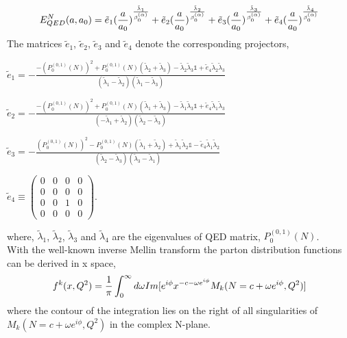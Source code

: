 \documentclass[review]{elsarticle}
\begin{document}
\begin{equation}
E_{QED}^{N}(a,a_{0})=\tilde{e}_{1}(\frac{a}{a_{0}})^{\frac{\tilde{\lambda}_{1}}{\text{\ensuremath{\beta_{0}^{(\alpha)}}}}}+\tilde{e}_{2}(\frac{a}{a_{0}})^{\frac{\tilde{\lambda}_{2}}{\text{\ensuremath{\beta_{0}^{(\alpha)}}}}}+\tilde{e}_{3}(\frac{a}{a_{0}})^{\frac{\tilde{\lambda}_{3}}{\beta_{0}^{(\alpha)}}}+\tilde{e}_{4}(\frac{a}{a_{0}})^{\frac{\tilde{\lambda}_{4}}{\text{\ensuremath{\beta_{0}^{(\alpha)}}}}}\label{eq:26}
\end{equation}
The matrices $\tilde{e}_{1}$, $\tilde{e}_{2}$, $\tilde{e}_{3}$
and $\tilde{e}_{4}$ denote the corresponding projectors,
\begin{center}
$\tilde{e}_{1}=-\frac{-(P_{0}^{(0,1)}(N))^{2}+P_{0}^{(0,1)}(N)(\tilde{\lambda}_{2}+\tilde{\lambda}_{3})-\tilde{\lambda}_{2}\tilde{\lambda}_{3}\mathbb{1}+\tilde{e}_{4}\tilde{\lambda}_{2}\tilde{\lambda}_{3}}{(\tilde{\lambda}_{1}-\tilde{\lambda}_{2})(\tilde{\lambda}_{1}-\tilde{\lambda}_{3})}$
\par\end{center}

\begin{center}
$\tilde{e}_{2}=-\frac{-(P_{0}^{(0,1)}(N))^{2}+P_{0}^{(0,1)}(N)(\tilde{\lambda}_{1}+\tilde{\lambda}_{3})-\tilde{\lambda}_{1}\tilde{\lambda}_{3}\mathbb{1}+\tilde{e}_{4}\tilde{\lambda}_{1}\tilde{\lambda}_{3}}{(-\tilde{\lambda}_{1}+\tilde{\lambda}_{2})(\tilde{\lambda}_{2}-\tilde{\lambda}_{3})}$
\par\end{center}

\begin{center}
$\tilde{e}_{3}=-\frac{(P_{0}^{(0,1)}(N))^{2}-P_{0}^{(0,1)}(N)(\tilde{\lambda}_{1}+\tilde{\lambda}_{2})+\tilde{\lambda}_{1}\tilde{\lambda}_{2}\mathbb{1}-\tilde{e}_{4}\tilde{\lambda}_{1}\tilde{\lambda}_{2}}{(\tilde{\lambda}_{2}-\tilde{\lambda}_{3})(\tilde{\lambda}_{3}-\tilde{\lambda}_{1})}$
\par\end{center}

\begin{center}
$\tilde{e}_{4}\equiv\left(\begin{array}{cccc}
0 & 0 & 0 & 0\\
0 & 0 & 0 & 0\\
0 & 0 & 1 & 0\\
0 & 0 & 0 & 0
\end{array}\right)$.
\par\end{center}
where, $\tilde{\lambda}_{1}$, $\tilde{\lambda}_{2}$, $\tilde{\lambda}_{3}$
and $\tilde{\lambda}_{4}$ are the eigenvalues of QED matrix,
$P_{0}^{(0,1)}(N)$.
\\With the well-known inverse Mellin transform \cite{Graudenz:1995sk}
the parton distribution functions can be derived in x space,
\begin{equation}
f^{k}(x,Q^{2})=\frac{1}{\pi}\int_{0}^{\infty}d\omega Im[e{}^{i\phi}x^{-c-\omega e^{i\phi}}\\
M_{k}(N=c+\omega e^{i\phi},Q^{2})]\label{eq:27}
\end{equation}
where the contour of the integration lies on the right of all singularities
of $M_{k}(N=c+\omega e^{i\phi},Q^{2})$ in the complex N-plane.
\end{document}
